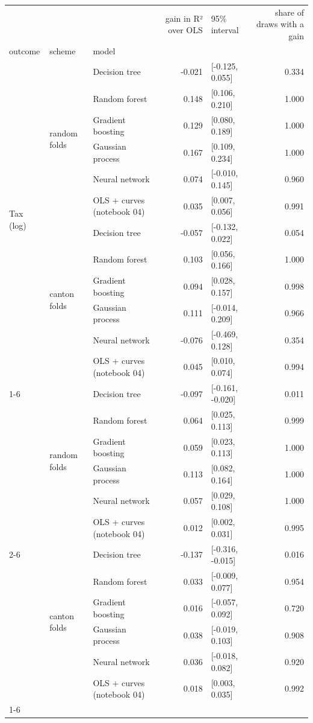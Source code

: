 \begin{tabular}{lllrlr}
\toprule
 &  &  & gain in R² over OLS & 95\% interval & share of draws with a gain \\
outcome & scheme & model &  &  &  \\
\midrule
\multirow[t]{12}{*}{Tax (log)} & \multirow[t]{6}{*}{random folds} & Decision tree & -0.021 & [-0.125, 0.055] & 0.334 \\
 &  & Random forest & 0.148 & [0.106, 0.210] & 1.000 \\
 &  & Gradient boosting & 0.129 & [0.080, 0.189] & 1.000 \\
 &  & Gaussian process & 0.167 & [0.109, 0.234] & 1.000 \\
 &  & Neural network & 0.074 & [-0.010, 0.145] & 0.960 \\
 &  & OLS + curves (notebook 04) & 0.035 & [0.007, 0.056] & 0.991 \\
\cline{2-6}
 & \multirow[t]{6}{*}{canton folds} & Decision tree & -0.057 & [-0.132, 0.022] & 0.054 \\
 &  & Random forest & 0.103 & [0.056, 0.166] & 1.000 \\
 &  & Gradient boosting & 0.094 & [0.028, 0.157] & 0.998 \\
 &  & Gaussian process & 0.111 & [-0.014, 0.209] & 0.966 \\
 &  & Neural network & -0.076 & [-0.469, 0.128] & 0.354 \\
 &  & OLS + curves (notebook 04) & 0.045 & [0.010, 0.074] & 0.994 \\
\cline{1-6} \cline{2-6}
\multirow[t]{12}{*}{SA rate (pp)} & \multirow[t]{6}{*}{random folds} & Decision tree & -0.097 & [-0.161, -0.020] & 0.011 \\
 &  & Random forest & 0.064 & [0.025, 0.113] & 0.999 \\
 &  & Gradient boosting & 0.059 & [0.023, 0.113] & 1.000 \\
 &  & Gaussian process & 0.113 & [0.082, 0.164] & 1.000 \\
 &  & Neural network & 0.057 & [0.029, 0.108] & 1.000 \\
 &  & OLS + curves (notebook 04) & 0.012 & [0.002, 0.031] & 0.995 \\
\cline{2-6}
 & \multirow[t]{6}{*}{canton folds} & Decision tree & -0.137 & [-0.316, -0.015] & 0.016 \\
 &  & Random forest & 0.033 & [-0.009, 0.077] & 0.954 \\
 &  & Gradient boosting & 0.016 & [-0.057, 0.092] & 0.720 \\
 &  & Gaussian process & 0.038 & [-0.019, 0.103] & 0.908 \\
 &  & Neural network & 0.036 & [-0.018, 0.082] & 0.920 \\
 &  & OLS + curves (notebook 04) & 0.018 & [0.003, 0.035] & 0.992 \\
\cline{1-6} \cline{2-6}
\bottomrule
\end{tabular}
